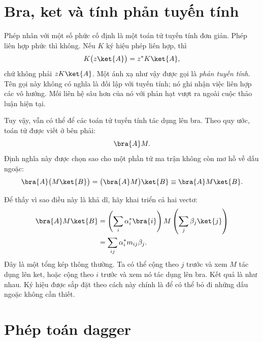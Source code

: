\section{Bra, ket và tính phản tuyến tính}

\begin{classroomqa}
\end{classroomqa}

Phép nhân với một số phức cố định là một toán tử tuyến tính đơn giản. Phép liên hợp phức thì không. Nếu \(K\) ký hiệu phép liên hợp, thì
\[
K\bigl(z\ket{A}\bigr)=z^*K\ket{A},
\]
chứ không phải \(zK\ket{A}\). Một ánh xạ như vậy được gọi là \emph{phản tuyến tính}. Tên gọi này không có nghĩa là đối lập với tuyến tính; nó ghi nhận việc liên hợp các vô hướng. Mối liên hệ sâu hơn của nó với phản hạt vượt ra ngoài cuộc thảo luận hiện tại.

Tuy vậy, vẫn có thể để các toán tử tuyến tính tác dụng lên bra. Theo quy ước, toán tử được viết ở bên phải:
\begin{equation}
\bra{A}M.
\end{equation}
Định nghĩa này được chọn sao cho một phần tử ma trận không còn mơ hồ về dấu ngoặc:
\begin{equation}
\bra{A}\bigl(M\ket{B}\bigr)
=
\bigl(\bra{A}M\bigr)\ket{B}
\equiv
\bra{A}M\ket{B}.
\label{eq:bracket-independence}
\end{equation}

Để thấy vì sao điều này là khả dĩ, hãy khai triển cả hai vectơ:
\begin{align}
\bra{A}M\ket{B}
 &=\left(\sum_i\alpha_i^*\bra{i}\right)
   M
   \left(\sum_j\beta_j\ket{j}\right)\\
 &=\sum_{ij}\alpha_i^*m_{ij}\beta_j.
\label{eq:matrix-element-double-sum}
\end{align}
Đây là một tổng kép thông thường. Ta có thể cộng theo \(j\) trước và xem \(M\) tác dụng lên ket, hoặc cộng theo \(i\) trước và xem nó tác dụng lên bra. Kết quả là như nhau. Ký hiệu được sắp đặt theo cách này chính là để có thể bỏ đi những dấu ngoặc không cần thiết.

\section{Phép toán dagger}

